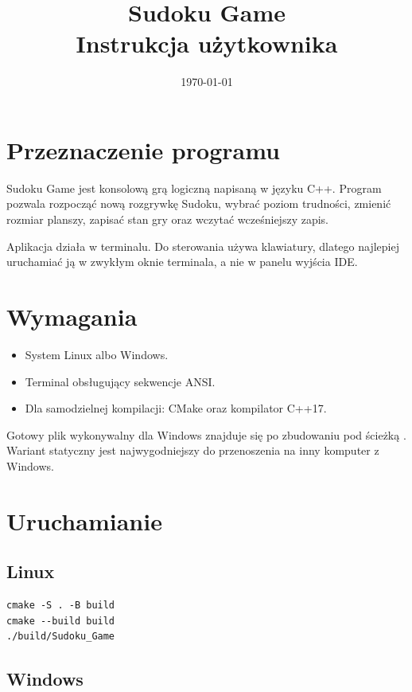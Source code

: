 \documentclass[12pt,a4paper]{article}
\title{Sudoku Game\\Instrukcja użytkownika}
\author{}
\date{\today}
\begin{document}
\maketitle
\tableofcontents
\newpage

\section{Przeznaczenie programu}

Sudoku Game jest konsolową grą logiczną napisaną w języku C++.
Program pozwala rozpocząć nową rozgrywkę Sudoku, wybrać poziom trudności,
zmienić rozmiar planszy, zapisać stan gry oraz wczytać wcześniejszy zapis.

Aplikacja działa w terminalu. Do sterowania używa klawiatury, dlatego najlepiej
uruchamiać ją w zwykłym oknie terminala, a nie w panelu wyjścia IDE.

\section{Wymagania}

\begin{itemize}[noitemsep]
    \item System Linux albo Windows.
    \item Terminal obsługujący sekwencje ANSI.
    \item Dla samodzielnej kompilacji: CMake oraz kompilator C++17.
\end{itemize}

Gotowy plik wykonywalny dla Windows znajduje się po zbudowaniu pod ścieżką
. Wariant statyczny jest
najwygodniejszy do przenoszenia na inny komputer z Windows.

\section{Uruchamianie}

\subsection{Linux}

\begin{verbatim}
cmake -S . -B build
cmake --build build
./build/Sudoku_Game
\end{verbatim}

\subsection{Windows}
\end{document}
